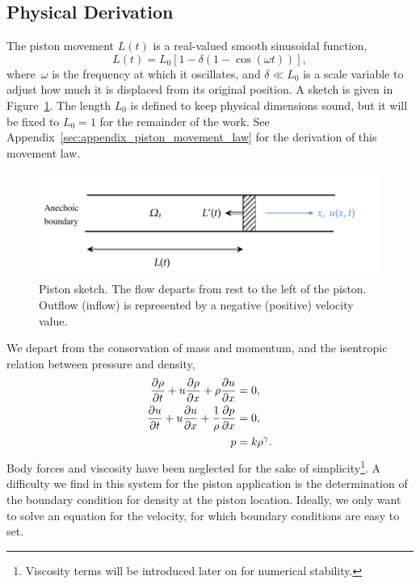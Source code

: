 \documentclass[../../thesis.tex]{subfiles}
\begin{document}
\subsection{Physical Derivation}
The piston movement $L(t)$ is a real-valued smooth sinusoidal function,
\begin{equation}
    L(t) = L_0 \left[1 - \delta \left(1 - \cos \left(\omega t\right)\right)\right],
\end{equation}
where~$\omega$ is the frequency at which it oscillates, 
and \mbox{$\delta \ll L_0$} is a scale variable to adjust how much it is displaced from its original position. 
A sketch is given in Figure~\ref{fig:piston}.
The length $L_0$ is defined to keep physical dimensions sound, 
but it will be fixed to $L_0=1$ for the remainder of the work.
See Appendix~\ref{sec:appendix_piston_movement_law} 
for the derivation of this movement law.
\begin{figure}[h]
    \includegraphics[width=1.05\columnwidth]{research_project/piston/figures/piston.pdf}
    \caption{Piston sketch. The flow departs from rest to the left of the piston.
    Outflow (inflow) is represented by a negative (positive) velocity value.}
    \label{fig:piston}
\end{figure}

We depart from the conservation of mass and momentum, 
and the isentropic relation between pressure and density,
\begin{subequations}
\begin{align}
    \pdv{\rho}{t} + u \pdv{\rho}{x} + \rho \pdv{u}{x} &= 0, \\ 
    \pdv{u}{t} + u \pdv{u}{x} + \frac{1}{\rho}\pdv{p}{x} &= 0, \\
    p &= k \rho^{\gamma} \label{eq:isentropic_relation}. 
\end{align}
\end{subequations}
Body forces and viscosity have been neglected for the sake of simplicity\footnote{Viscosity terms will be introduced later on for numerical stability.}.
A difficulty we find in this system for the piston application is the determination of the boundary condition for density at the piston location.
Ideally, we only want to solve an equation for the velocity, for which boundary conditions are easy to set.
\end{document}
